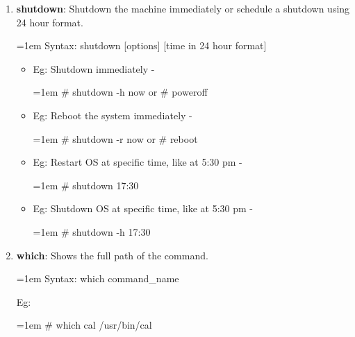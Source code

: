 \begin{flushleft}
\begin{enumerate}
		
		\bigskip
		\bigskip
		\item \textbf{shutdown}: Shutdown the machine immediately or schedule a shutdown using 24 hour format.
		\bigskip
		\begin{tcolorbox}[breakable,notitle,boxrule=1pt,colback=pink,colframe=pink]
			\color{black}
			\font=1em
			Syntax:  shutdown [options] [time in 24 hour format]
			\font=4pt
		\end{tcolorbox}
		\bigskip
		\begin{itemize}
			\item Eg: Shutdown immediately -
			\begin{tcolorbox}[breakable,notitle,boxrule=1pt,colback=black,colframe=black]
				\color{green}
				\font=1em
				\# shutdown -h now
				\newline
				or
				\newline
				\# poweroff
				\font=4pt
			\end{tcolorbox}
			\item Eg: Reboot the system immediately -
			\bigskip
			\begin{tcolorbox}[breakable,notitle,boxrule=1pt,colback=black,colframe=black]
				\color{green}
				\font=1em
				\# shutdown -r now
				\newline
				\color{green}
				or
				\newline
				\color{green}
				\# reboot
				\font=4pt
			\end{tcolorbox}
			\item Eg: Restart OS at specific time, like at 5:30 pm -
			\bigskip
			\begin{tcolorbox}[breakable,notitle,boxrule=1pt,colback=black,colframe=black]
				\color{green}
				\font=1em
				\# shutdown 17:30
				\font=4pt
			\end{tcolorbox}
			\item Eg: Shutdown OS at specific time, like at 5:30 pm -
			\bigskip
			\begin{tcolorbox}[breakable,notitle,boxrule=1pt,colback=black,colframe=black]
				\color{green}
				\font=1em
				\# shutdown -h 17:30
				\font=4pt
			\end{tcolorbox}
		\end{itemize}

		\bigskip
		\bigskip
		

		\item \textbf{which}: Shows the full path of the command.
		\bigskip
		\begin{tcolorbox}[breakable,notitle,boxrule=1pt,colback=pink,colframe=pink]
			\color{black}
			\font=1em
			Syntax: which command\_name
			\font=4pt
		\end{tcolorbox}
		Eg:
		\bigskip
		\begin{tcolorbox}[breakable,notitle,boxrule=1pt,colback=black,colframe=black]
			\color{green}
			\font=1em
			\# which cal
			\newline
			\color{white}
			/usr/bin/cal
			\font=4pt
		\end{tcolorbox}


\end{enumerate}
\end{flushleft}
